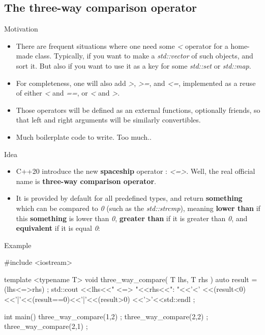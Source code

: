 \subsection[spaceship]{The three-way comparison operator}

\begin{frame}[fragile]
  \begin{block}{Motivation}
    \begin{itemize}
    \item There are frequent situations where one need some {\it <} operator for a home-made class. Typically, if you want to make a {\it std::vector} of such objects, and sort it. But also if you want to use it as a key for some {\it std::set} or {\it std::map}.
    \item For completeness, one will also add {\it >}, {\it >=}, and {\it <=}, implemented as a reuse of either {\it <} and {\it ==}, or {\it <} and {\it >}.
    \item Those operators will be defined as an external functions, optionally friends, so that left and right arguments will be similarly convertibles.
    \item Much boilerplate code to write. Too much..
    \end{itemize}
  \end{block}
\end{frame}

\begin{frame}[fragile]
  \begin{block}{Idea}
    \begin{itemize}
    \item C++20 introduce the new \textbf{spaceship} operator : {\it <=>}. Well, the real official name is \textbf{three-way comparison operator}.
    \item It is provided by default for all predefined types, and return \textbf{something} which can be compared to {\it 0} (such as the {\it std::strcmp}), meaning \textbf{lower than} if this \textbf{something} is lower than {\it 0}, \textbf{greater than} if it is greater than {\it 0}, and \textbf{equivalent} if it is equal {\it 0}:
    \end{itemize}
  \end{block}
  \begin{exampleblock}{Example}
    \begin{cppcode*}{}
#include <iostream>

template <typename T>
void three_way_compare( T lhs, T rhs )
 {
  auto result = (lhs<=>rhs) ;
  std::cout
    <<lhs<<" <=> "<<rhs<<": "<<'<'
    <<(result<0)<<'|'<<(result==0)<<'|'<<(result>0)
    <<'>'<<std::endl ;
 }

int main()
 {
  three_way_compare(1,2) ;
  three_way_compare(2,2) ;
  three_way_compare(2,1) ;
 }
    \end{cppcode*}
  \end{exampleblock}
\end{frame}

